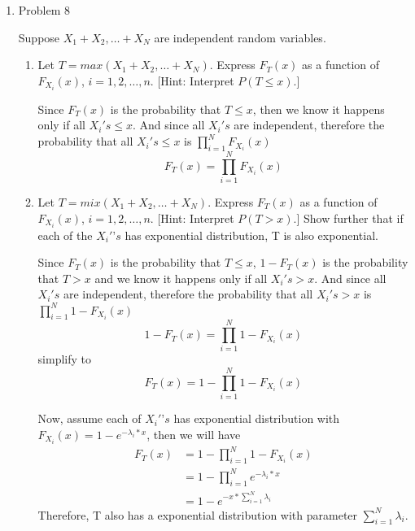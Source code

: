 \documentclass[letterpaper]{article}
\begin{document}
\begin{enumerate}
\medskip

\item{Problem 8}
\begin{mdframed}
Suppose $X_1 + X_2, \dots + X_N$ are independent random variables.
\end{mdframed}
\begin{enumerate}
\item{} Let $T = max(X_1 + X_2, \dots + X_N)$. Express $F_{T}(x)$ as a function of $F_{X_i}(x)$, $i = 1, 2, \dots, n$. [Hint: Interpret $P(T \le x)$.]

Since $F_{T}(x)$ is the probability that $T \le x$, then we know it happens only if all $X_i's \le x$. And since all $X_i's$ are independent, therefore the probability that all $X_i's \le x$ is $\prod_{i=1}^{N}{F_{X_i}(x)}$
\begin{equation}
F_{T}(x) = \prod_{i=1}^{N}{F_{X_i}(x)}
\end{equation}

\item{}  Let $T = mix(X_1 + X_2, \dots + X_N)$. Express $F_{T}(x)$ as a function of $F_{X_i}(x)$, $i = 1, 2, \dots, n$. [Hint: Interpret $P(T > x)$.] Show further that if each of the $X_i'’s$ has exponential distribution, T is also exponential.

Since $F_{T}(x)$ is the probability that $T \le x$, $1 - F_{T}(x)$  is the probability that $T > x$ and we know it happens only if all $X_i's > x$. And since all $X_i's$ are independent, therefore the probability that all $X_i's > x$ is $\prod_{i=1}^{N}{1 - F_{X_i}(x)}$
\begin{equation}
1 - F_{T}(x) = \prod_{i=1}^{N}{1 - F_{X_i}(x)}
\end{equation}
simplify to
\begin{equation}
F_{T}(x) = 1 - \prod_{i=1}^{N}{1 - F_{X_i}(x)}
\end{equation}

Now, assume each of $X_i'’s$ has exponential distribution with $F_{X_i}(x) = 1 - e^{-\lambda_i*x}$, then we will have
\begin{equation}
\begin{split}
F_{T}(x) &= 1 - \prod_{i=1}^{N}{1 - F_{X_i}(x)}\\
              & = 1 - \prod_{i=1}^{N}{e^{-\lambda_i*x}}\\
              & = 1 - e^{-x * \sum_{i=1}^{N}{\lambda_i}}
\end{split}
\end{equation}
Therefore, T also has a exponential distribution with parameter $\sum_{i=1}^{N}{\lambda_i}$.

\end{enumerate}
\medskip


\end{enumerate}
\end{document}
